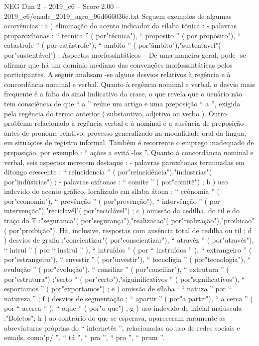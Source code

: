 \begin{textsample}{NEG Dim 2 – 2019\_c6 – Score 2.00 – 2019\_c6/enade\_2019\_agro\_96d666036e.txt}
Seguem exemplos de algumas ocorrências : a ) eliminação do acento indicador da sílaba tônica : - palavras proparoxítonas : “ tecnica ” ( por"técnica"), “ proposito ” ( por propósito"), “ catastrofe ” ( por catástrofe"), “ ambito ” ( por"âmbito"),"sustentavel"( por"sustentável") ; Aspectos morfossintáticos – De uma maneira geral, pode -se afirmar que há um domínio mediano das convenções morfossintáticas pelos participantes.
A seguir analisam -se alguns desvios relativos à regência e à concordância nominal e verbal.
Quanto à regência nominal e verbal, o desvio mais frequente é a falta do sinal indicativo da crase, o que revela que o usuário não tem consciência de que “ a ” reúne um artigo e uma preposição “ a ”, exigida pela regência do termo anterior ( substantivo, adjetivo ou verbo ).
Outro problema relacionado à regência verbal e à nominal é a ausência de preposição antes de pronome relativo, processo generalizado na modalidade oral da língua, em situações de registro informal.
Também é recorrente o emprego inadequado de preposição, por exemplo : “ ações a evitá -los ”.
Quanto à concordância nominal e verbal, seis aspectos merecem destaque : - palavras paroxítonas terminadas em ditongo crescente : “ reincidencia ” ( por"reincidência"),"industrias"( por"indústrias") ; - palavras oxítonas : “ comite ” ( por"comitê") ; b ) uso indevido do acento gráfico, localizado em sílaba átona : “ ecônomia ” ( por"economia"), “ prevênção ” ( por"prevenção"), “ intervênção ” ( por intervenção"),"reciclavél"( por"reciclável") ; c ) omissão da cedilha, do til e do traço do T :"seguranca"( por"segurança"),"realizacao"( por"realização"),"proibicao"( por"proibição").
Há, inclusive, respostas com ausência total de cedilha ou til ; d ) desvios de grafia :"concientizar"( por"conscientizar"), “ atravéz ” ( por"através"), “ intrui ” ( por “ instrui ” ), “ intruídos ” ( por “ instruídos ” ), “ extrangeiro ” ( por"estrangeiro"), “ envestir ” ( por"investir"), “ tecnoligia ” ( por"tecnologia"), “ evulução ” ( por"evolução"), “ consiliar ” ( por"conciliar"), “ extrutura ” ( por"estrutura") ;"serto ” ( por"certo"),"siguinificativos ” ( por"significativos"), “ esportamos ” ( por"exportamos") ; e ) omissão de sílaba : “ natuza ” por “ natureza ” ; f ) desvios de segmentação : “ apartir ” ( por"a partir"), “ a cerca ” ( por “ acerca ” ), “ oque ” ( por"o que") ; g ) uso indevido de inicial maiúscula :"Boletos"; h ) ao contrário do que se esperava, apareceram raramente as abreviaturas próprias do “ internetês ”, relacionadas ao uso de redes sociais e emails, como"p/ ”, “ tá ”, “ pra ”, “ pro ”, “ prum ”.

\end{textsample}
